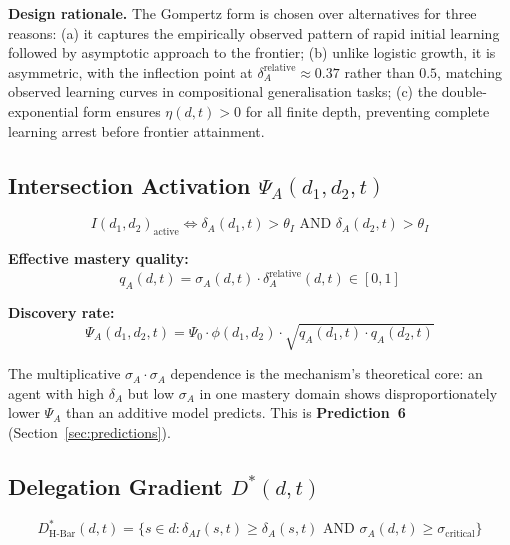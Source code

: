 \documentclass[11pt,a4paper]{article}
\begin{document}
\textbf{Design rationale.} The Gompertz form is chosen over alternatives
for three reasons: (a) it captures the empirically observed pattern of
rapid initial learning followed by asymptotic approach to the frontier;
(b) unlike logistic growth, it is asymmetric, with the inflection point
at $\delta_A^{\text{relative}} \approx 0.37$ rather than $0.5$, matching
observed learning curves in compositional generalisation tasks; (c) the
double-exponential form ensures $\eta(d,t) > 0$ for all finite depth,
preventing complete learning arrest before frontier attainment.

\subsection{Intersection Activation \texorpdfstring{$\Psi_A(d_1,d_2,t)$}{Psi\_A(d\_1,d\_2,t)}}\label{sec:intersection}

\begin{equation}\label{eq:activation-condition}
I(d_1,d_2)_{\text{active}} \iff \delta_A(d_1,t) > \theta_I \text{ AND } \delta_A(d_2,t) > \theta_I
\end{equation}

\textbf{Effective mastery quality:}
\begin{equation}\label{eq:mastery-quality}
q_A(d,t) = \sigma_A(d,t) \cdot \delta_A^{\text{relative}}(d,t) \in [0,1]
\end{equation}

\textbf{Discovery rate:}
\begin{equation}\label{eq:discovery-rate}
\Psi_A(d_1,d_2,t) = \Psi_0 \cdot \phi(d_1,d_2) \cdot \sqrt{q_A(d_1,t) \cdot q_A(d_2,t)}
\end{equation}

The multiplicative $\sigma_A \cdot \sigma_A$ dependence is the
mechanism's theoretical core: an agent with high $\delta_A$ but low
$\sigma_A$ in one mastery domain shows disproportionately lower $\Psi_A$
than an additive model predicts. This is \textbf{Prediction~6}
(Section~\ref{sec:predictions}).

\subsection{Delegation Gradient \texorpdfstring{$D^*(d,t)$}{D*(d,t)}}\label{sec:delegation}

\begin{equation}\label{eq:delegation-hbar}
D^*_{\text{H-Bar}}(d,t) = \{s \in d : \delta_{AI}(s,t) \geq \delta_A(s,t) \text{ AND } \sigma_A(d,t) \geq \sigma_{\text{critical}}\}
\end{equation}
\end{document}

